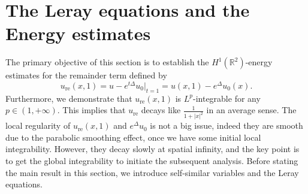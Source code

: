 \documentclass[12pt]{amsart}
\numberwithin{equation}{section}              %
\theoremstyle{remark}
\begin{document}
	
	
	
	\section{The  Leray equations and the Energy estimates}\label{sec:energy estimates}
	The primary objective of this section is to establish the $H^1(\mathbb{R}^2)$-energy estimates for the remainder term defined by
	\begin{equation*}
		u_{\text{re}}(x,1)= \left.u - e^{t\Delta}u_0\right.|_{t=1}= u(x,1)- e^{\Delta}u_0(x).
	\end{equation*}  
	Furthermore, we demonstrate that $	u_{\text{re}}(x,1)$ is $L^{p}$-integrable for any $p \in (1, +\infty)$. This implies that $u_{\textrm{re}}$  decays like $\frac{1}{1+|x|^2}$ in an average sense.
	The local regularity of $u_{\text{re}}(x,1)$ and $e^{\Delta}u_0$ is not a big issue, indeed they are smooth due to the parabolic smoothing effect, once we have some initial local integrability. However, they decay slowly at spatial infinity, and the key point is to get the global integrability to initiate the subsequent analysis. Before stating the main result in this section, we introduce self-similar variables and the Leray equations.

	
	
	
\end{document}
